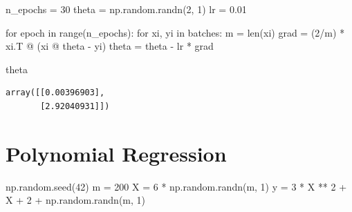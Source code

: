 \documentclass[
]{report}
\newenvironment{Shaded}{\begin{snugshade}}{\end{snugshade}}
\newcommand{\BuiltInTok}[1]{\textcolor[rgb]{0.00,0.23,0.31}{#1}}
\newcommand{\ControlFlowTok}[1]{\textcolor[rgb]{0.00,0.23,0.31}{#1}}
\newcommand{\DecValTok}[1]{\textcolor[rgb]{0.68,0.00,0.00}{#1}}
\newcommand{\FloatTok}[1]{\textcolor[rgb]{0.68,0.00,0.00}{#1}}
\newcommand{\KeywordTok}[1]{\textcolor[rgb]{0.00,0.23,0.31}{#1}}
\newcommand{\NormalTok}[1]{\textcolor[rgb]{0.00,0.23,0.31}{#1}}
\newcommand{\OperatorTok}[1]{\textcolor[rgb]{0.37,0.37,0.37}{#1}}
\begin{document}
\begin{Shaded}
\begin{Highlighting}[]
\NormalTok{n\_epochs }\OperatorTok{=} \DecValTok{30}
\NormalTok{theta }\OperatorTok{=}\NormalTok{ np.random.randn(}\DecValTok{2}\NormalTok{, }\DecValTok{1}\NormalTok{)}
\NormalTok{lr }\OperatorTok{=} \FloatTok{0.01}

\ControlFlowTok{for}\NormalTok{ epoch }\KeywordTok{in} \BuiltInTok{range}\NormalTok{(n\_epochs):}
    \ControlFlowTok{for}\NormalTok{ xi, yi }\KeywordTok{in}\NormalTok{ batches:}
\NormalTok{        m }\OperatorTok{=} \BuiltInTok{len}\NormalTok{(xi)}
\NormalTok{        grad }\OperatorTok{=}\NormalTok{ (}\DecValTok{2}\OperatorTok{/}\NormalTok{m) }\OperatorTok{*}\NormalTok{ xi.T }\OperatorTok{@}\NormalTok{ (xi }\OperatorTok{@}\NormalTok{ theta }\OperatorTok{{-}}\NormalTok{ yi)}
\NormalTok{        theta }\OperatorTok{=}\NormalTok{ theta }\OperatorTok{{-}}\NormalTok{ lr }\OperatorTok{*}\NormalTok{ grad   }
\end{Highlighting}
\end{Shaded}

\begin{Shaded}
\begin{Highlighting}[]
\NormalTok{theta}
\end{Highlighting}
\end{Shaded}

\begin{verbatim}
array([[0.00396903],
       [2.92040931]])
\end{verbatim}

\hypertarget{polynomial-regression}{%
\chapter{Polynomial Regression}\label{polynomial-regression}}

\begin{Shaded}
\begin{Highlighting}[]
\NormalTok{np.random.seed(}\DecValTok{42}\NormalTok{)}
\NormalTok{m }\OperatorTok{=} \DecValTok{200}
\NormalTok{X }\OperatorTok{=} \DecValTok{6} \OperatorTok{*}\NormalTok{ np.random.randn(m, }\DecValTok{1}\NormalTok{)}
\NormalTok{y }\OperatorTok{=} \DecValTok{3} \OperatorTok{*}\NormalTok{ X }\OperatorTok{**} \DecValTok{2} \OperatorTok{+}\NormalTok{ X }\OperatorTok{+} \DecValTok{2} \OperatorTok{+}\NormalTok{ np.random.randn(m, }\DecValTok{1}\NormalTok{)}
\end{Highlighting}
\end{Shaded}
\end{document}
